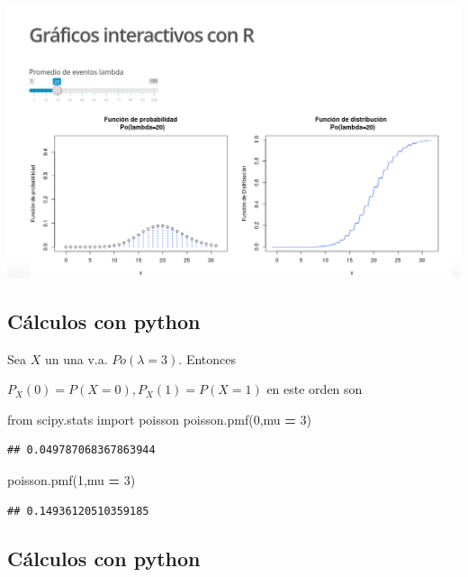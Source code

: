 \documentclass[]{book}
\newenvironment{Shaded}{\begin{snugshade}}{\end{snugshade}}
\newcommand{\DecValTok}[1]{\textcolor[rgb]{0.00,0.00,0.81}{#1}}
\newcommand{\ImportTok}[1]{#1}
\newcommand{\NormalTok}[1]{#1}
\newcommand{\OperatorTok}[1]{\textcolor[rgb]{0.81,0.36,0.00}{\textbf{#1}}}
\begin{document}
\href{https://github.com/joanby/probabilidad}{\includegraphics{Images/noshinyImages/interactiva_poisson2.png}}

\hypertarget{cuxe1lculos-con-python-6}{%
\subsection{Cálculos con python}\label{cuxe1lculos-con-python-6}}

Sea \(X\) un una v.a. \(Po(\lambda=3)\). Entonces

\(P_X(0)=P(X=0), P_X(1)=P(X=1)\) en este orden son

\begin{Shaded}
\begin{Highlighting}[]
\ImportTok{from}\NormalTok{ scipy.stats }\ImportTok{import}\NormalTok{ poisson}
\NormalTok{poisson.pmf(}\DecValTok{0}\NormalTok{,mu }\OperatorTok{=} \DecValTok{3}\NormalTok{)}
\end{Highlighting}
\end{Shaded}

\begin{verbatim}
## 0.049787068367863944
\end{verbatim}

\begin{Shaded}
\begin{Highlighting}[]
\NormalTok{poisson.pmf(}\DecValTok{1}\NormalTok{,mu }\OperatorTok{=} \DecValTok{3}\NormalTok{)}
\end{Highlighting}
\end{Shaded}

\begin{verbatim}
## 0.14936120510359185
\end{verbatim}

\hypertarget{cuxe1lculos-con-python-7}{%
\subsection{Cálculos con python}\label{cuxe1lculos-con-python-7}}
\end{document}
